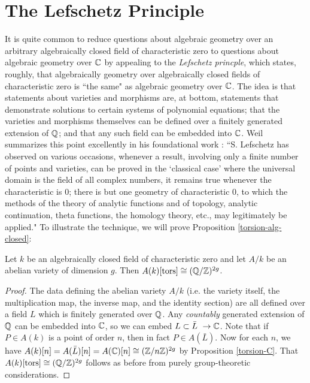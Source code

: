 \section{The Lefschetz Principle}
It is quite common to reduce questions about algebraic geometry over an arbitrary algebraically closed field of characteristic zero to questions about algebraic geometry over $\mathbb{C}$ by appealing to the \emph{Lefschetz princple}, which states, roughly, that algebraically geometry over algebraically closed fields of characteristic zero is ``the same" as algebraic geometry over $\mathbb{C}$. The idea is that statements about varieties and morphisms are, at bottom, statements that demonstrate solutions to certain systems of polynomial equations; that the varieties and morphisms themselves can be defined over a finitely generated extension of $\mathbb{Q}$; and that any such field can be embedded into $\mathbb{C}$. Weil summarizes this point excellently in his foundational work \cite{weil1946foundations}: ``S. Lefschetz has observed on various occasions, whenever a result, involving only a finite number of points and varieties, can be proved in the `classical case' where the universal domain is the field of all complex numbers, it remains true whenever the characteristic is 0; there is but one geometry of characteristic 0, to which the methods of the theory of analytic functions and of topology, analytic continuation, theta functions, the homology theory, etc., may legitimately be applied." To illustrate the technique, we will prove Proposition \ref{torsion-alg-closed}:

\begin{proposition}
\label{torsion-alg-closed-lefschetz}
Let $k$ be an algebraically closed field of characteristic zero and let $A/k$ be an abelian variety of dimension $g$. Then $A(k)[\operatorname{tors}]\cong (\mathbb{Q}/\mathbb{Z})^{2g}$.
\end{proposition}
\begin{proof}
The data defining the abelian variety $A/k$ (i.e. the variety itself, the multiplication map, the inverse map, and the identity section) are all defined over a field $L$ which is finitely generated over $\mathbb{Q}$. Any \emph{countably} generated extension of $\mathbb{Q}$ can be embedded into $\mathbb{C}$, so we can embed $L\subset\bar{L}\
\rightarrow \mathbb{C}$. Note that if $P\in A(k)$ is a point of order $n$, then in fact $P\in A(\bar{L})$. Now for each $n$, we have $A(k)[n]=A(\bar{L})[n]=A(\mathbb{C})[n]\cong (\mathbb{Z}/n\mathbb{Z})^{2g}$ by Proposition \ref{torsion-C}. That $A(k)[\operatorname{tors}]\cong (\mathbb{Q}/\mathbb{Z})^{2g}$ follows as before from purely group-theoretic considerations.
\end{proof}

